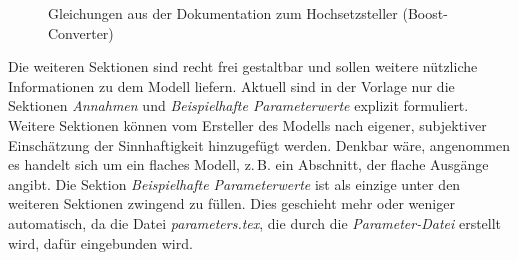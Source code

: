 \begin{figure}[H]
	\centering
	\caption[Beispiel der Gleichungen der Dokumentation]{Gleichungen aus der Dokumentation zum Hochsetzsteller (Boost-Converter)\protect\footnotemark}
	\label{fig:BspDok_ModelEquations}
\end{figure}
%
Die weiteren Sektionen sind recht frei gestaltbar und sollen weitere nützliche Informationen zu dem Modell liefern. Aktuell sind in der Vorlage nur die Sektionen \textit{Annahmen} und \textit{Beispielhafte Parameterwerte} explizit formuliert. Weitere Sektionen können vom Ersteller des Modells nach eigener, subjektiver Einschätzung der Sinnhaftigkeit hinzugefügt werden. Denkbar wäre, angenommen es handelt sich um ein flaches Modell, z.\,B. ein Abschnitt, der flache Ausgänge angibt. Die Sektion \textit{Beispielhafte Parameterwerte} ist als einzige unter den weiteren Sektionen zwingend zu füllen. Dies geschieht mehr oder weniger automatisch, da die Datei \textit{parameters.tex}, die durch die \textit{Parameter-Datei} erstellt wird, dafür eingebunden wird.

